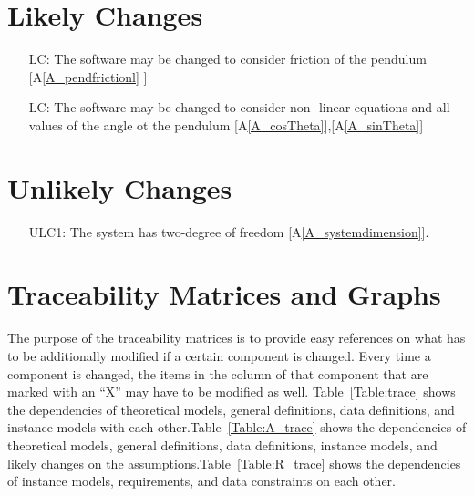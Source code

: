 \documentclass[12pt]{article}
\newcommand{\aref}[1]{A\ref{#1}}
\newcounter{lcnum} %
\begin{document}
\section{Likely Changes}    

\noindent \begin{itemize}

\item[LC\refstepcounter{lcnum}\thelcnum\label{LC_meaningfulLabel}:] 
{The software may be changed to consider friction of the pendulum [\aref{A_pendfrictionl} ]}

\item[LC\refstepcounter{lcnum}\thelcnum\label{LC_meaningfulLabel}:] 
{The software may be changed to consider non- linear equations and all values of the angle ot the pendulum [\aref{A_cosTheta}],[\aref{A_sinTheta}]}


\end{itemize}

\section{Unlikely Changes}    

\noindent \begin{itemize}

\item[ULC1\label{LC_meaningfulLabel}:]
{The system has two-degree of freedom [\aref{A_systemdimension}].}

\end{itemize}

\section{Traceability Matrices and Graphs}

The purpose of the traceability matrices is to provide easy references on what
has to be additionally modified if a certain component is changed.  Every time a
component is changed, the items in the column of that component that are marked
with an ``X'' may have to be modified as well.  Table~\ref{Table:trace} shows the
dependencies of theoretical models, general definitions, data definitions, and
instance models with each other.Table~\ref{Table:A_trace} shows the dependencies of theoretical models, general definitions, data definitions, instance models, and likely changes on the assumptions.Table~\ref{Table:R_trace} shows the
dependencies of instance models, requirements, and data constraints on each
other. 
\end{document}
